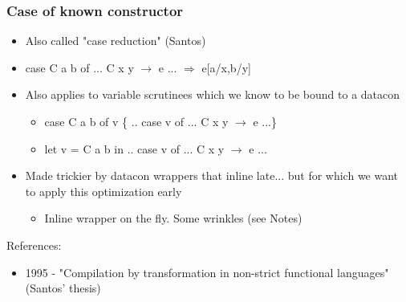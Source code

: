 \documentclass[aspectratio=169]{beamer}
\begin{document}
\begin{frame}
  \frametitle{Case of known constructor}
  \begin{itemize}
    \item Also called "case reduction" (Santos)
    \item case C a b of ... C x y $\rightarrow$ e ... $\Longrightarrow$ e[a/x,b/y]
    \item Also applies to variable scrutinees which we know to be bound to a
      datacon
      \begin{itemize}
        \item case C a b of v \{ .. case v of ... C x y $\rightarrow$ e ...\}
        \item let v = C a b in .. case v of ... C x y $\rightarrow$ e ...
      \end{itemize}
    \item Made trickier by datacon wrappers that inline late... but for which we
      want to apply this optimization early
      \begin{itemize}
        \item Inline wrapper on the fly. Some wrinkles (see Notes)
      \end{itemize}
  \end{itemize}

  References:
  \begin{itemize}
    \item 1995 - "Compilation by transformation in non-strict functional
      languages" (Santos' thesis)
  \end{itemize}
\end{frame}
\end{document}
